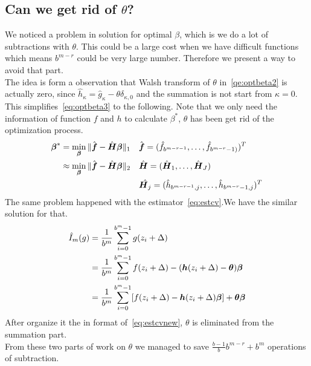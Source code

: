 \subsection{Can we get rid of $\theta$?}
We noticed a problem in solution for optimal $\beta$, which is we do a lot of subtractions with $\theta$. This could be a large cost when we have difficult functions which means $b^{m-r}$ could be very large number. Therefore we present a way to avoid that part. \\
The idea is form a observation that Walsh transform of $\theta$ in~\eqref{qe:optbeta2} is actually zero, since $\hat{h}_\kappa = \hat{g}_\kappa-\theta\delta_{\kappa,0}$ and the summation is not start from $\kappa=0$.\\
This simplifies~\eqref{eq:optbeta3} to the following. Note that we only need the information of function $f$ and $h$ to calculate $\beta^*$, $\theta$ has been get rid of the optimization process.
\begin{align}
    \boldsymbol{\beta}^*
    \label{eq:optbetanew}
    &=\min_{\boldsymbol{\beta}}\|\hat{\boldsymbol{f}}-\hat{\boldsymbol{H}}\boldsymbol{\beta}\|_1
    && \hat{\boldsymbol{f}}= (\hat{f}_{b^{m-r-1}},\dots,\hat{f}_{b^{m-r}-1)})^T \\
        \label{eq:optbeta4}
    &\approx\min_{\boldsymbol{\beta}}\|\hat{\boldsymbol{f}}-\hat{\boldsymbol{H}}\boldsymbol{\beta}\|_2
    && \hat{\boldsymbol{H}}= (\hat{\boldsymbol{H}}_1, \dots, \hat{\boldsymbol{H}}_J)\\
    & \notag 
    &&\hat{\boldsymbol{H}_j}=(\hat{h}_{b^{m-r-1},j},\dots, \hat{h}_{b^{m-r}-1,j})^T
\end{align}
The same problem happened with the estimator~\ref{eq:estcv}.We have the similar solution for that.
\begin{align}
    \notag
    \hat{I}_m({g})
    & = \frac{1}{b^m}\sum_{i=0}^{b^m-1}g(z_i+\Delta)\\
    \notag
    & = \frac{1}{b^m}\sum_{i=0}^{b^m-1}f(z_i+\Delta)-(\boldsymbol{h}(z_i+\Delta)-\boldsymbol{\theta})\boldsymbol{\beta}\\
    \label{eq:estcvnew}
    & = \frac{1}{b^m}\sum_{i=0}^{b^m-1}[f(z_i+\Delta)-\boldsymbol{h}(z_i+\Delta)\boldsymbol{\beta}]+\boldsymbol{\theta}\boldsymbol{\beta}
\end{align}
After organize it the in format of~\eqref{eq:estcvnew}, $\theta$ is eliminated from the summation part.\\
From these two parts of work on $\theta$ we managed to save $\frac{b-1}{b}b^{m-r}+b^m$ operations of subtraction.

